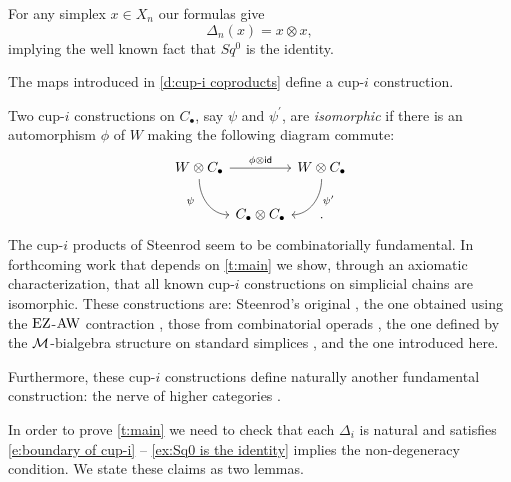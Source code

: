 \begin{example} \label{ex:Sq0 is the identity}
	For any simplex $x \in X_n$ our formulas give
	\begin{equation*}
	\Delta_n(x) = x \otimes x,
	\end{equation*}
	implying the well known fact that $Sq^0$ is the identity.
\end{example}

\begin{theorem} \label{t:main}
	The maps introduced in \cref{d:cup-i coproducts} define a cup-$i$ construction.
\end{theorem}

\begin{remark}
	Two \mbox{cup-$i$} constructions on $C_\bullet$, say $\psi$ and $\psi^\prime$, are \textit{isomorphic} if there is an automorphism $\phi$ of $W$ making the following diagram commute:
	\[
	\begin{tikzcd} [column sep = 0, row sep=normal]
	W \otimes C_\bullet \arrow[rr, "\phi \otimes \id"] \arrow[rd, in=180, out=-90, "\psi^{\phantom{\prime}}"', near start] & &
	W \otimes C_\bullet \arrow[ld, in=0, out=-90, "\psi^\prime", near start] \\
	& C_\bullet \ot C_\bullet & .
	\end{tikzcd}
	\]
	The cup-$i$ products of Steenrod seem to be combinatorially fundamental.
	In forthcoming work \cite{medina2018axiomatic} that depends on \cref{t:main} we show, through an axiomatic characterization, that all known cup-$i$ constructions on simplicial chains are isomorphic.
	These constructions are: Steenrod's original \cite{steenrod1947products}, the one obtained using the $\operatorname{EZ}$-$\operatorname{AW}$ contraction \cite{real1996computability, gonzalez-diaz1999steenrod}, those from combinatorial operads \cite{mcclure2003multivariable, berger2004combinatorial}, the one defined by the $\mathcal{M}$-bialgebra structure on standard simplices \cite{medina2020prop1, medina2018prop2},
	and the one introduced here.

	Furthermore, these cup-$i$ constructions define naturally another fundamental construction: the nerve of higher categories \cite{street1987orientals, medina2020globular}.
\end{remark}


In order to prove \cref{t:main} we need to check that each $\Delta_i$ is natural and satisfies \eqref{e:boundary of cup-i} -- \cref{ex:Sq0 is the identity} implies the non-degeneracy condition.
We state these claims as two lemmas.

